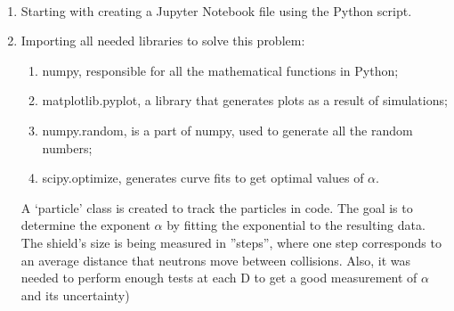 \documentclass[12pt]{article}
\begin{document}
\vskip0.1in
 \\

\begin{enumerate}
    \item Starting with creating a Jupyter Notebook file using the Python script. 
    \item Importing all needed libraries to solve this problem:
    \begin{enumerate}
        \item numpy, responsible for all the mathematical functions in Python;
        \item matplotlib.pyplot, a library that generates plots as a result of simulations;
        \item numpy.random, is a part of numpy, used to generate all the random numbers;
        \item scipy.optimize, generates curve fits to get optimal values of $\alpha$.
    \end{enumerate}


A ‘particle’ class is created to track the particles in
code. 
The goal is to determine the exponent $\alpha$ by fitting the exponential to the resulting data.
The shield’s size is being measured in ”steps”, where one step corresponds to
an average distance that neutrons move between collisions. Also, it was needed to perform enough tests at each D to get a good measurement of $\alpha$ and its uncertainty)


\end{enumerate}
\end{document}
